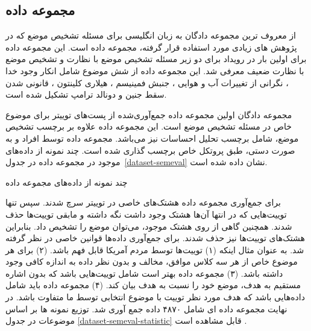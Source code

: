 \subsection{مجموعه داده
}

از معروف ترین مجموعه دادگان به زبان انگلیسی برای مسئله تشخیص موضع که در پژوهش های زیادی مورد استفاده قرار گرفته، مجموعه داده
  است. این مجموعه داده برای اولین بار در رویداد
برای دو زیر مسئله تشخیص موضع با نظارت و تشخیص موضع با نظارت ضعیف معرفی شد. این مجموعه داده از شش موضوع شامل انکار وجود خدا
،
نگرانی از تغییرات آب و هوایی
،
جنبش فمینیسم
،
هیلاری کلینتون
،
قانونی شدن سقط جنین
و دونالد ترامپ
تشکیل شده است.

مجموعه دادگان
اولین مجموعه داده جمع‌آوری‌شده از پست‌های توییتر برای موضوع خاص
در مسئله تشخیص موضع است. این مجموعه داده علاوه بر برچسب تشخیص موضع، شامل برچسب تحلیل احساسات نیز می‌باشد. مجموعه داده توسط افراد و به صورت دستی، طبق پروتکل خاص برچسب گذاری شده است. چند نمونه از دادە‌های موجود در مجموعه داده در جدول~\ref{dataset-semeval} نشان داده شده است.


\begin{table}[ht]
	\centering
	\small
	\caption[چند نمونه از دادە‌های مجموعه داده
	]{\label{dataset-semeval}  چند نمونه از دادە‌های مجموعه داده
		\cite{mohammad-etal-2016-semeval}}
	
	\begin{figure}[H]
	\end{figure}
	
\end{table}

برای جمع‌آوری مجموعه داده هشتک‌های خاصی در توییتر سرچ شدند. سپس تنها توییت‌هایی که در انتها آن‌ها هشتک وجود داشت نگه داشته و مابقی توییت‌ها حذف شدند. همچنین گاهی از روی هشتک موجود، می‌توان موضع را تشخیص داد. بنابراین هشتک‌های توییت‌ها نیز حذف شدند. برای جمع‌آوری دادە‌ها قوانین خاصی در نظر گرفته شد. به عنوان مثال اینکه (۱) توییت‌ها توسط مردم آمریکا قابل فهم باشد. (۲) برای
هر موضوع خاص از هر سه کلاس موافق، مخالف و بدون نظر داده به اندازه کافی وجود داشته باشد. (۳) مجموعه داده بهتر است شامل توییت‌هایی باشد که بدون اشاره مستقیم به هدف، موضع خود را نسبت به هدف بیان کند. (۴) مجموعه داده باید شامل دادە‌هایی باشد که هدف مورد نظر توییت با موضوع انتخابی توسط ما متفاوت باشد.
در نهایت مجموعه دادە ای شامل ۴۸۷۰ داده جمع آوری شد. توزیع نمونە ها بر اساس موضوعات در جدول
\ref{dataset-semeval-statistic}
قابل مشاهده است .


